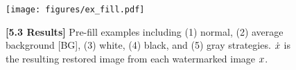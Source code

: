 \begin{figure}[!ht]
    \centering
    \texttt{[image: figures/ex\_fill.pdf]}
    \caption{\textbf{[5.3 Results]} Pre-fill examples including (1) normal, (2) average background [BG], (3) white, (4) black, and (5) gray strategies. $\dot{x}$ is the resulting restored image from each watermarked image $x$.}
    \label{fig:fill_ex}
\end{figure}